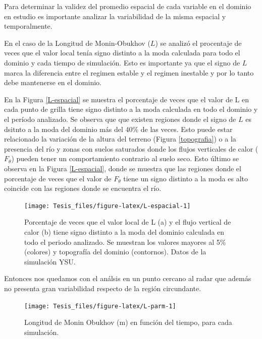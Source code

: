 \documentclass[12pt,spanish,oneside]{book}
\begin{document}
Para determinar la validez del promedio espacial de cada variable en el
dominio en estudio es importante analizar la variabilidad de la misma
espacial y temporalmente.

En el caso de la Longitud de Monin-Obukhov (\(L\)) se analizó el
procentaje de veces que el valor local tenía signo distinto a la moda
calculada para todo el dominio y cada tiempo de simulación. Esto es
importante ya que el signo de \(L\) marca la diferencia entre el regimen
estable y el regimen inestable y por lo tanto debe mantenerse en el
dominio.

En la Figura \ref{L-espacial} se muestra el porcentaje de veces que el
valor de L en cada punto de grilla tiene signo distinto a la moda
calculada en todo el dominio y el período analizado. Se observa que que
existen regiones donde el signo de \(L\) es dsitnto a la moda del
dominio más del 40\% de las veces. Esto puede estar relacionado la
variación de la altura del terreno (Figura \ref{topografia}) o a la
presencia del río y zonas con suelos saturados donde los flujos
verticales de calor (\(F_{\theta}\)) pueden tener un comportamiento
contrario al suelo seco. Esto último se observa en la Figura
\ref{L-espacial}, donde se muestra que las regiones donde el porcentaje
de veces que el valor de \(F_{\theta}\) tiene un signo distinto a la
moda es alto coincide con las regiones donde se encuentra el río.

\begin{figure}

{\centering \texttt{[image: Tesis\_files/figure-latex/L-espacial-1]} 

}

\caption{Porcentaje de veces que el valor local de L (a) y el flujo vertical de calor (b) tiene signo distinto a la moda del dominio calculada en todo el periodo analizado. Se muestran los valores mayores al 5\% (colores) y topografía del dominio (contornos). Datos de la simulación YSU. \label{L-esp}}\label{fig:L-espacial}
\end{figure}

Entonces nos quedamos con el análsis en un punto cercano al radar que
además no presenta gran variabilidad respecto de la región circundante.

\begin{figure}

{\centering \texttt{[image: Tesis\_files/figure-latex/L-parm-1]} 

}

\caption{Longitud de Monin Obukhov (m) en función del tiempo, para cada simulación. \label{L-param}}\label{fig:L-parm}
\end{figure}
\end{document}
